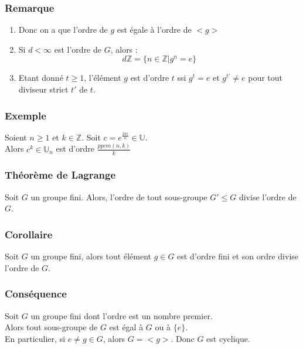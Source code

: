 \documentclass[a4paper, oneside]{report}
\newcommand{\Z}{\mathbb{Z}}
\newcommand{\U}{\mathbb{U}}
\newcommand{\displayastyle}{\displaystyle}
\begin{document}
\subsubsection{Remarque}
\begin{enumerate}
\item Donc on a que l'ordre de $g$ est égale à l'ordre de $<g>$
\item Si $d<\infty$ est l'ordre de $G$, alors :
$$d\Z=\{n\in \Z | g^n =e \}$$
\item Etant donné $t\geq 1$, l'élément $g$ est d'ordre $t$ ssi $g^t=e$ et $g^{t'}\neq e$ pour tout diviseur strict $t'$ de $t$.
\end{enumerate}

\subsubsection{Exemple}
Soient $n\geq 1$ et $k\in \Z$. Soit $c=e^{\frac{2\pi i}{n}}\in \U$.\\
Alors $c^k\in \U_n$ est d'ordre $\displayastyle\frac{ppcm(n,k)}{k}$

\subsubsection{Théorème de Lagrange}
Soit $G$ un groupe fini. Alors, l'ordre de tout sous-groupe $G'\leq G$ divise l'ordre de $G$.

\subsubsection{Corollaire}
Soit $G$ un groupe fini, alors tout élément $g\in G$ est d'ordre fini et son ordre divise l'ordre de $G$.

\subsubsection{Conséquence}
Soit $G$ un groupe fini dont l'ordre est un nombre premier.\\
Alors tout sous-groupe de $G$ est égal à $G$ ou à $\{e\}$.\\
En particulier, si $e\neq g\in G$, alors $G=<g>$. Donc $G$ est cyclique.
\end{document}
